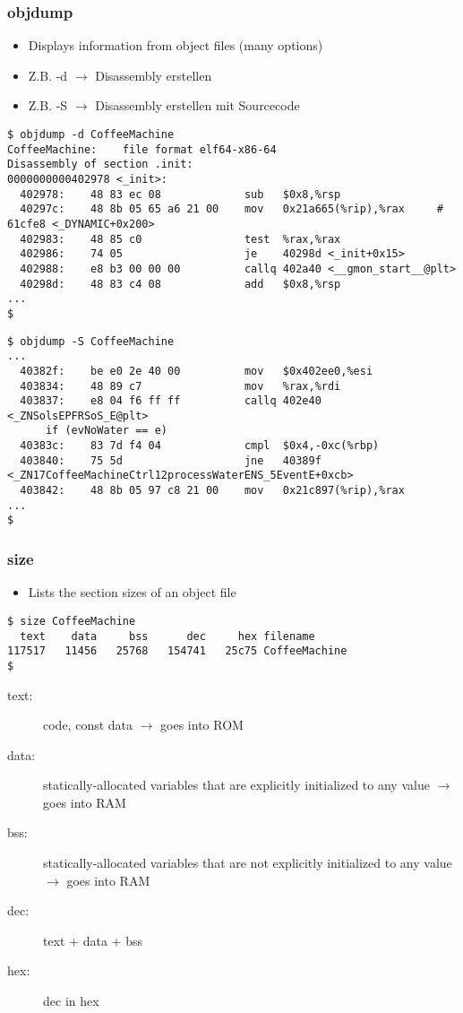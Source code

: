 \subsubsection{objdump}
\begin{itemize}
    \item Displays information from object files (many options)
    \item Z.B. -d $\rightarrow$ Disassembly erstellen
    \item Z.B. -S $\rightarrow$ Disassembly erstellen mit Sourcecode
\end{itemize}
\begin{lstlisting}[style=bash]
$ objdump -d CoffeeMachine
CoffeeMachine:    file format elf64-x86-64
Disassembly of section .init:
0000000000402978 <_init>:
  402978:    48 83 ec 08             sub   $0x8,%rsp
  40297c:    48 8b 05 65 a6 21 00    mov   0x21a665(%rip),%rax     # 61cfe8 <_DYNAMIC+0x200>
  402983:    48 85 c0                test  %rax,%rax
  402986:    74 05                   je    40298d <_init+0x15>
  402988:    e8 b3 00 00 00          callq 402a40 <__gmon_start__@plt>
  40298d:    48 83 c4 08             add   $0x8,%rsp
...
$
\end{lstlisting}
\begin{lstlisting}[style=bash]
$ objdump -S CoffeeMachine
...
  40382f:    be e0 2e 40 00          mov   $0x402ee0,%esi
  403834:    48 89 c7                mov   %rax,%rdi
  403837:    e8 04 f6 ff ff          callq 402e40 <_ZNSolsEPFRSoS_E@plt>
      if (evNoWater == e)
  40383c:    83 7d f4 04             cmpl  $0x4,-0xc(%rbp)
  403840:    75 5d                   jne   40389f <_ZN17CoffeeMachineCtrl12processWaterENS_5EventE+0xcb>
  403842:    48 8b 05 97 c8 21 00    mov   0x21c897(%rip),%rax
...
$
\end{lstlisting}

\subsubsection{size}
\begin{itemize}
    \item Lists the section sizes of an object file
\end{itemize}
\begin{lstlisting}[style=bash]
$ size CoffeeMachine
  text    data     bss      dec     hex filename
117517   11456   25768   154741   25c75 CoffeeMachine
$
\end{lstlisting}

\begin{description}
  \item[text:] code, const data $\rightarrow$ goes into ROM
  \item[data:] statically-allocated variables that are explicitly initialized to any value $\rightarrow$ goes into RAM
  \item[bss:] statically-allocated variables that are not explicitly initialized to any value $\rightarrow$ goes into RAM
  \item[dec:] text + data + bss
  \item[hex:] dec in hex
\end{description}

